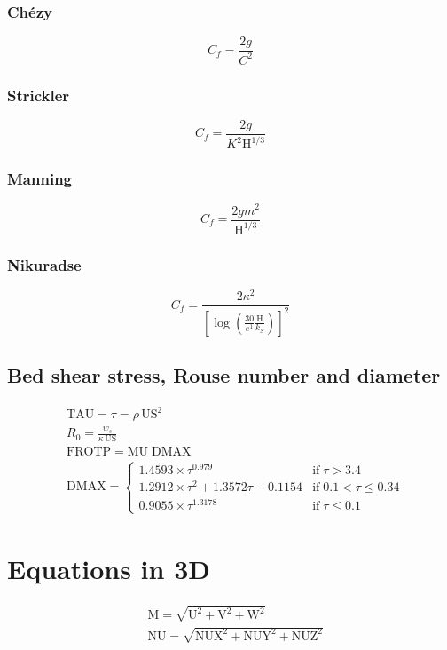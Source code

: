 \documentclass{article}
\newcommand{\HAU}{\mathrm{H}}
\newcommand{\U}{\mathrm{U}}
\newcommand{\V}{\mathrm{V}}
\newcommand{\M}{\mathrm{M}}
\newcommand{\US}{\mathrm{US}}
\newcommand{\DMAX}{\mathrm{DMAX}}
\newcommand{\TAU}{\mathrm{TAU}}
\newcommand{\IF}{\mathrm{if}\;}
\begin{document}
\begin{multicols}{2}
\subsubsection{Chézy}
\[C_f = \frac{2 g}{C^2}\]

\subsubsection{Strickler}
\[ C_f = \frac{2 g}{K^2 \HAU^{1/3}}\]

\subsubsection{Manning}
\[ C_f = \frac{2 g m^2}{\HAU^{1/3}}\]

\subsubsection{Nikuradse}

\[ C_f = \frac{2 \kappa^2}{ \left[ \log\left(\frac{30}{e^1} \frac{\HAU}{k_S}\right) \right] ^2} \]
\end{multicols}


\subsection{Bed shear stress, Rouse number and diameter}
\[\begin{aligned}
& \TAU = \tau = \rho \,\US^2\\
& R_0 = \frac{w_s}{\kappa\, \US}\\
& \mathrm{FROTP} = \mathrm{MU} \; \DMAX\\
& \DMAX = \begin{cases}
     1.4593 \times \tau^{0.979} &\IF   \tau > 3.4 \\
     1.2912 \times \tau^2 + 1.3572 \tau - 0.1154
    &\IF 0.1 < \tau \leqslant 0.34 \\
     0.9055 \times \tau^{1.3178} &\IF \tau \leqslant 0.1
  \end{cases}
\end{aligned}\]


\section{Equations in 3D}

\[\begin{aligned}
& \M = \sqrt{\U^2+\V^2+\mathrm{W}^2}\\
& \mathrm{NU} = \sqrt{\mathrm{NUX}^2+\mathrm{NUY}^2+\mathrm{NUZ}^2}
\end{aligned}\]
\end{document}
